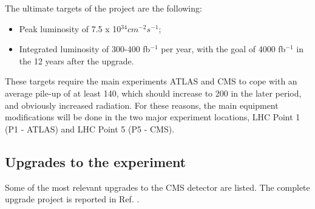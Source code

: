 The ultimate targets of the project are the following:
\begin{itemize}
    \item Peak luminosity of 7.5 x 10$^{34}cm^{-2}s^{-1}$;
    \item Integrated luminosity of 300-400 fb$^{-1}$ per year, with the goal of 4000 fb$^{-1}$ in the 12 years after the upgrade.
\end{itemize}
These targets require the main experiments ATLAS and CMS to cope with an average pile-up of at least 140, which should increase to 200 in the later period, and obviously increased radiation.
For these reasons, the main equipment modifications will be done in the two major experiment locations, LHC Point 1 (P1 - ATLAS) and LHC Point 5 (P5 - CMS).\\
\subsection{Upgrades to the experiment}
Some of the most relevant upgrades to the CMS detector are listed. The complete upgrade project is reported in Ref. \cite{phase2_tdr}.\\

